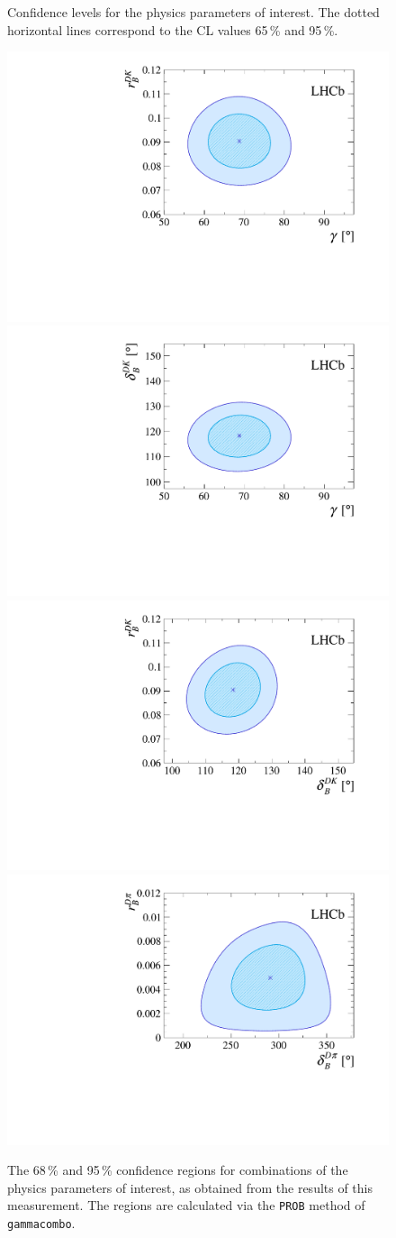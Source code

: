 \begin{figure}[tp]
    \caption{Confidence levels for the physics parameters of interest. The dotted horizontal lines correspond to the CL values 65\,\% and 95\,\%.
    }
    \label{fig:1d_CL}
\end{figure}

\begin{figure}[tp]
    \centering
    \includegraphics[width=0.46\columnwidth]{figures/analysis/interpretation/2d_g_r_dk_paper.pdf}
    \includegraphics[width=0.46\columnwidth]{figures/analysis/interpretation/2d_g_d_dk_paper.pdf}
    \includegraphics[width=0.46\columnwidth]{figures/analysis/interpretation/2d_d_dk_r_dk_paper.pdf}
    \includegraphics[width=0.46\columnwidth]{figures/analysis/interpretation/2d_d_dpi_r_dpi_paper.pdf}
    \caption{The 68\,\% and 95\,\% confidence regions for combinations of the physics parameters of interest, as obtained from the results of this measurement. The regions are calculated via the \texttt{PROB} method of \texttt{gammacombo}.}
    \label{fig:2d_CL}
\end{figure}



